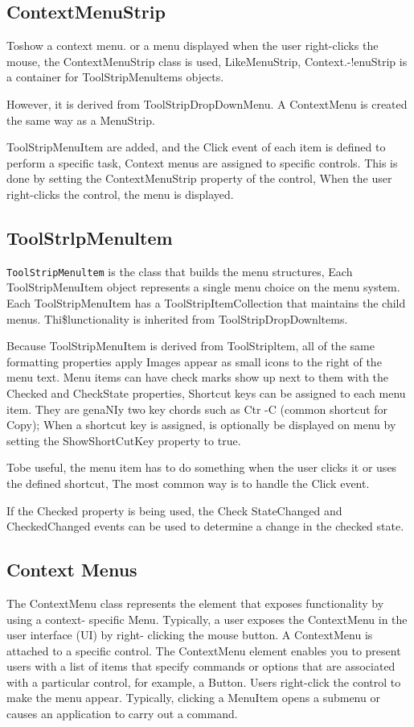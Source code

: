 \subsection{ContextMenuStrip}
Toshow a context menu. or a menu displayed when the user right-clicks the mouse, the ContextMenuStrip class is used, LikeMenuStrip, Context.-!enuStrip is a container for ToolStripMenultems objects.

However, it is derived from ToolStripDropDownMenu. A ContextMenu is created the same way as a MenuStrip.

ToolStripMenuItem are added, and the Click event of each item is defined to perform a specific task, Context menus are assigned to specific controls. This is done by setting the ContextMenuStrip property of the control, When the user right-clicks the control, the menu is displayed.

\subsection{ToolStrlpMenultem}
\texttt{ToolStripMenultem} is the class that builds the menu structures, Each ToolStripMenuItem object represents a single menu choice on the menu system. Each ToolStripMenuItem has a ToolStripItemCollection that maintains the child menus. Thi\$lunctionality is inherited from ToolStripDropDownltems.

Because ToolStripMenuItem is derived from ToolStripltem, all of the same formatting properties apply Images appear as small icons to the right of the menu text. Menu items can have check marks show up next to them with the Checked and CheckState properties, Shortcut keys can be assigned to each menu item. They are genaNIy two key chords such as Ctr -C (common shortcut for Copy); When a shortcut key is assigned, is optionally be displayed on menu by setting the ShowShortCutKey property to true.

Tobe useful, the menu item has to do something when the user clicks it or uses the defined shortcut, The most common way is to handle the Click event.

If the Checked property is being used, the Check StateChanged and CheckedChanged events can be used to determine a change in the checked state.



\subsection{Context Menus}
The ContextMenu class represents the element that exposes functionality by using a context-
specific Menu. Typically, a user exposes the ContextMenu in the user interface (UI) by right-
clicking the mouse button. A ContextMenu is attached to a specific control. The ContextMenu
element enables you to present users with a list of items that specify commands or options that are
associated with a particular control, for example, a Button. Users right-click the control to make the
menu appear. Typically, clicking a MenuItem opens a submenu or causes an application to carry out
a command.



